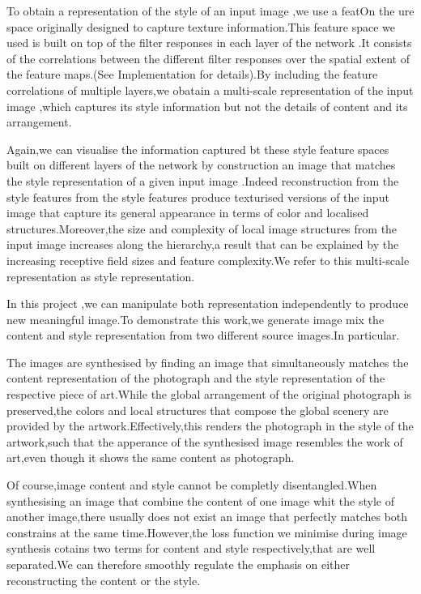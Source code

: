 \documentclass[conference]{IEEEtran}
\begin{document}
To obtain a representation of the style of an input image ,we use a featOn the ure
space originally designed to capture texture information.This feature space we used is built on top of the filter responses in each layer of the network
.It consists of the correlations between the different filter responses over the spatial extent of the feature maps.(See Implementation for details).By including the feature correlations of multiple layers,we obatain a multi-scale representation of the input image ,which captures its style information but not the details of content and its arrangement.

Again,we can visualise the information captured bt these style feature spaces built on different layers of the network by construction an image that matches the style representation of a given input image .Indeed reconstruction from the style features from the style features produce 
texturised versions of the input image that capture its general appearance in 
terms of color and localised structures.Moreover,the size and complexity of local image structures from the input image increases along the hierarchy,a result that can be explained by the increasing receptive field sizes and feature complexity.We refer to this multi-scale representation as style representation.

In this project ,we can manipulate both representation independently to produce new meaningful image.To demonstrate this work,we generate image mix 
the content and style representation from two different source images.In particular.

The images are synthesised by finding an image that simultaneously matches the
content representation of the photograph and the style representation of the
respective piece of art.While the global arrangement of the original photograph is preserved,the colors and local structures that compose the global scenery are provided by the artwork.Effectively,this renders the photograph in the style of the artwork,such that the apperance of the synthesised image resembles the work of art,even though it shows the same content as photograph.

Of course,image content and style cannot be completly disentangled.When synthesising an image that combine 
the content of one image whit the style of another image,there usually does not exist an image that perfectly 
matches both constrains at the same time.However,the loss function we minimise during image synthesis cotains
two terms for content and style respectively,that are well separated.We can therefore smoothly regulate 
the emphasis on either reconstructing the content or the style.
\end{document}
